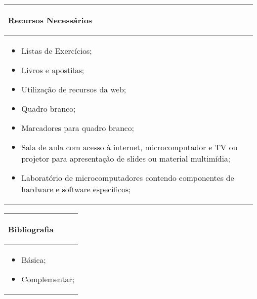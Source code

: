 \begin{table}[h!]
\centering
\begin{small} 
 
\setlength{\tabcolsep}{3pt} 
\begin{tabular}{|p{15cm}|}\hline

\begin{center}\textbf{Recursos Necessários}\end{center}\\ \hline
\begin{itemize} 
  \item Listas de Exercícios;
  \item Livros e apostilas;
  \item Utilização de recursos da web;
  \item Quadro branco;
  \item Marcadores para quadro branco;
  \item Sala de aula com acesso à internet, microcomputador e TV ou projetor para apresentação de slides ou material multimídia;
  \item Laboratório de microcomputadores contendo componentes de hardware e software específicos;
\end{itemize}
 \\ \hline

\end{tabular} 
\end{small}
\label{dadosinstituicao}
\end{table}


\begin{table}[h!]
\centering
\begin{small} 
\setlength{\tabcolsep}{3pt} 
\begin{tabular}{|p{15cm}|}\hline

\begin{center}\textbf{Bibliografia}\end{center}\\ \hline
\begin{itemize} 
  \item Básica;
  \item Complementar;
\end{itemize}
 \\ \hline

\end{tabular} 
\end{small}
\label{dadosinstituicao}
\end{table}

